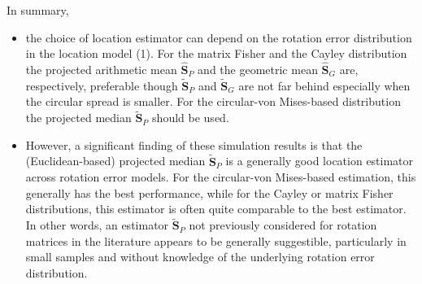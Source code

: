 In summary,
\begin{itemize}
\item the choice of location estimator can depend on the rotation error distribution in the location model (1).  For the matrix Fisher and the Cayley distribution  the projected arithmetic mean $\widehat{\bm S}_P$ and the geometric mean $\widehat{\bm S}_G$ are, respectively, preferable though $\widetilde{\bm S}_P$ and $\widetilde{\bm S}_G$ are not far behind especially when the circular spread is smaller. For the circular-von Mises-based distribution  the projected median $\widetilde{\bm S}_P$  should be used.

\item  However, a significant finding of these simulation results is that the (Euclidean-based)  projected median $\widetilde{\bm S}_P$ is a generally good location estimator across rotation error models.  For the circular-von Mises-based estimation, this generally has the best performance, while for the Cayley or matrix Fisher distributions, this estimator is often quite comparable to the best estimator.  In other words, an estimator $\widetilde{\bm S}_P$ not previously considered for rotation matrices in the literature appears to be generally suggestible, particularly in small samples and without knowledge of the underlying rotation error distribution.

\end{itemize}
